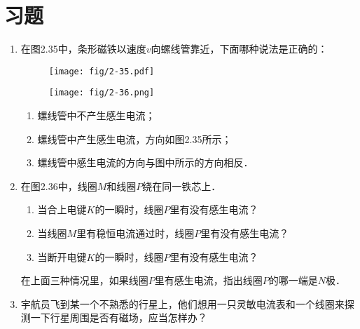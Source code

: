 \section*{习题}
\begin{enumerate}
    \item 在图2.35中，条形磁铁以速度$v$向螺线管靠近，下面哪种说法是正确的：

\begin{figure}[htp]
\centering
\begin{minipage}[t]{0.48\textwidth}
\centering
\texttt{[image: fig/2-35.pdf]}
\caption{}
\end{minipage}
\begin{minipage}[t]{0.48\textwidth}
\centering
\texttt{[image: fig/2-36.png]}
\caption{}
\end{minipage}
\end{figure}

    \begin{enumerate}
\item 螺线管中不产生感生电流；
\item 螺线管中产生感生电流，方向如图2.35所示；
\item 螺线管中感生电流的方向与图中所示的方向相反．
    \end{enumerate}
    
    \item 在图2.36中，线圈$M$和线圈$P$绕在同一铁芯上．
    \begin{enumerate}
        \item 当合上电键$K$的一瞬时，线圈$P$里有没有感生电流？
        \item 当线圈$M$里有稳恒电流通过时，线圈$P$里有没有感生电流？
        \item 当断开电键$K$的一瞬时，线圈$P$里有没有感生电流？
    \end{enumerate}
    在上面三种情况里，如果线圈$P$里有感生电流，指出线圈$P$的哪一端是$N$极．
    \item 宇航员飞到某一个不熟悉的行星上，他们想用一只灵敏电流表和一个线圈来探测一下行星周围是否有磁场，应当怎样办？
   

\end{enumerate}
